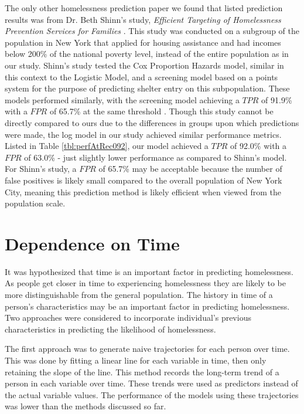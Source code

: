 \documentclass[12pt]{report}
\begin{document}
The only other homelessness prediction paper we found that listed prediction results was from Dr. Beth Shinn's study, \textit{Efficient Targeting of Homelessness Prevention Services for Families} \cite{shinn2013efficient}. This study was conducted on a subgroup of the population in New York that applied for housing assistance and had incomes below 200\% of the national poverty level, instead of the entire population as in our study. Shinn's study tested the Cox Proportion Hazards model, similar in this context to the Logistic Model, and a screening model based on a points system for the purpose of predicting shelter entry on this subpopulation. These models performed similarly, with the screening model achieving a $TPR$ of 91.9\% with a $FPR$ of 65.7\% at the same threshold \cite{shinn2013efficient}. Though this study cannot be directly compared to ours due to the differences in groups upon which predictions were made, the log model in our study achieved similar performance metrics. Listed in Table \ref{tbl:perfAtRec092}, our model achieved a $TPR$ of 92.0\% with a $FPR$ of 63.0\% - just slightly lower performance as compared to Shinn's model. For Shinn's study, a $FPR$ of 65.7\% may be acceptable because the number of false positives is likely small compared to the overall population of New York City, meaning this prediction method is likely efficient when viewed from the population scale. 

\section{Dependence on Time}
It was hypothesized that time is an important factor in predicting homelessness. As people get closer in time to experiencing homelessness they are likely to be more distinguishable from the general population. The history in time of a person's characteristics may be an important factor in predicting homelessness. Two approaches were considered to incorporate individual's previous characteristics in predicting the likelihood of homelessness.

The first approach was to generate naive trajectories for each person over time. This was done by fitting a linear line for each variable in time, then only retaining the slope of the line. This method records the long-term trend of a person in each variable over time. These trends were used as predictors instead of the actual variable values. The performance of the models using these trajectories was lower than the methods discussed so far.
\end{document}
